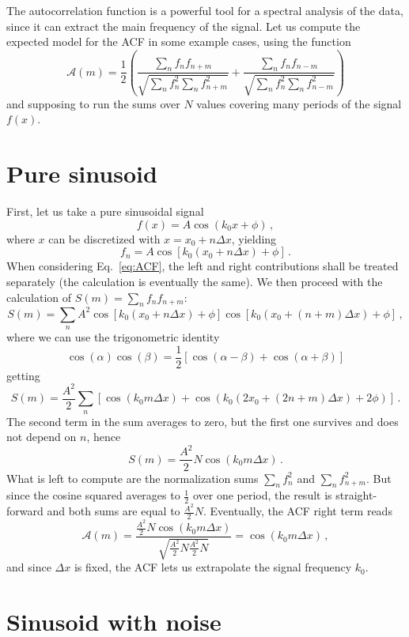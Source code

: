 \label{chap:app_ACF}
The autocorrelation function is a powerful tool for a spectral analysis of the data, since it can extract the main frequency of the signal. Let us compute the expected model for the ACF in some example cases, using the function
\begin{equation}
    \mathcal{A}(m) = \frac{1}{2} \left( \frac{\sum_{n} f_n f_{n+m}}{\sqrt{\sum_{n} f_n^2 \sum_{n} f_{n+m}^2}} + \frac{\sum_{n} f_n f_{n-m}}{\sqrt{\sum_{n} f_n^2 \sum_{n} f_{n-m}^2}} \right)
    \label{eq:ACF}
\end{equation}
and supposing to run the sums over $N$ values covering many periods of the signal $f(x)$.

\section{Pure sinusoid}
First, let us take a pure sinusoidal signal
\[
    f(x) = A\cos(k_0 x + \phi)\, ,
\]  
where $x$ can be discretized with $x = x_0 + n\Delta x$, yielding
\begin{equation*}
    f_n = A\cos[k_0(x_0 + n\Delta x) + \phi]\, .
\end{equation*}
When considering Eq.\ \eqref{eq:ACF}, the left and right contributions shall be treated separately (the calculation is eventually the same). We then proceed with the calculation of $S(m) = \sum_n f_n f_{n+m}$:
\begin{equation*}
    S(m) = \sum_n A^2 \cos[k_0(x_0 + n\Delta x) + \phi] \cos[k_0(x_0 + (n+m)\Delta x) + \phi]\, ,
\end{equation*}
where we can use the trigonometric identity
\[
    \cos(\alpha)\cos(\beta) = \frac{1}{2}[\cos(\alpha-\beta) + \cos(\alpha+\beta)]
\]
getting
\begin{equation*}
    S(m) = \frac{A^2}{2}\sum_n [\cos(k_0 m \Delta x) + \cos(k_0(2x_0 + (2n + m)\Delta x) + 2\phi)]\, .
\end{equation*}
The second term in the sum averages to zero, but the first one survives and does not depend on $n$, hence
\[
    S(m) = \frac{A^2}{2}N\cos(k_0 m \Delta x)\, .
\]
What is left to compute are the normalization sums $\sum_n f_n^2$ and $\sum_n f_{n+m}^2$. But since the cosine squared averages to $\frac{1}{2}$ over one period, the result is straight-forward and both sums are equal to $\frac{A^2}{2}N$. Eventually, the ACF right term reads
\begin{equation*}
    \mathcal{A}(m) = \frac{\frac{A^2}{2}N\cos(k_0 m \Delta x)}{\sqrt{\frac{A^2}{2}N \frac{A^2}{2}N}} = \cos(k_0 m \Delta x)\, ,
\end{equation*}
and since $\Delta x$ is fixed, the ACF lets us extrapolate the signal frequency $k_0$.

\section{Sinusoid with noise}